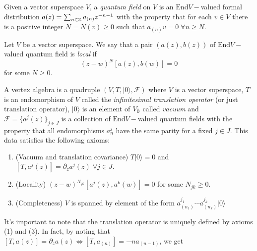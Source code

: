 \begin{dang}
    \begin{definition}\cite{de2006finite}
        Given a vector superspace $V$, a \textit{quantum field} on $V$ is an $\text{End}V-$valued formal distribution $a(z)=\sum_{n\in\mathbb{Z}}a_{(n)}z^{-n-1}$ with the property that for each $v\in V$ there is a positive integer $N=N(v)\geq0$ such that $a_{(n)}v=0\;\forall n\geq N$.
    \end{definition}
\end{dang}
\begin{dang}
    \begin{definition}\cite{de2006finite}
        Let $V$ be a vector superspace. We say that a pair $(a(z),b(z))$ of $\text{End}V-$valued quantum field is \textit{local} if 
        \begin{equation}
            (z-w)^N[a(z),b(w)]=0
        \end{equation}
        for some $N\geq 0$.
    \end{definition}
\end{dang}
\begin{dang}
    \begin{definition}
        A vertex algebra is a quadruple $(V,T, |0\rangle,\mathcal{F})$ where $V$ is a vector superspace, $T$ is an endomorphism of $V$ called the \textit{infinitesimal translation operator} (or just translation operator), $|0\rangle$ is an element of $V_{\Bar{0}}$ called \textit{vacuum} and $\mathcal{F}=\{a^j(z)\}_{j\in J}$ is a collection of $\text{End}V-$valued quantum fields with the property that all endomorphisms $a_n^j$ have the same parity for a fixed $j\in J$. This data satisfies the following axioms:
        \begin{enumerate}
            \item[(1)] (Vacuum and translation covariance) $T|0\rangle = 0$ and $[T,a^j(z)]=\partial_za^j(z)\;\forall j\in J$.
            \item[(2)] (Locality) $(z-w)^{N_{jk}}[a^j(z),a^k(w)]=0$ for some $N_{jk}\geq0$.
            \item[(3)] (Completeness) $V$ is spanned by element of the form $a_{(n_1)}^{j_1}\cdots a_{(n_k)}^{j_k}|0\rangle$
        \end{enumerate}
    \end{definition}
\end{dang}
It's important to note that the translation operator is uniquely defined by axioms (1) and (3). In fact, by noting that $[T,a(z)]=\partial_za(z)\iff [T,a_{(n)}]=-na_{(n-1)}$, we get
